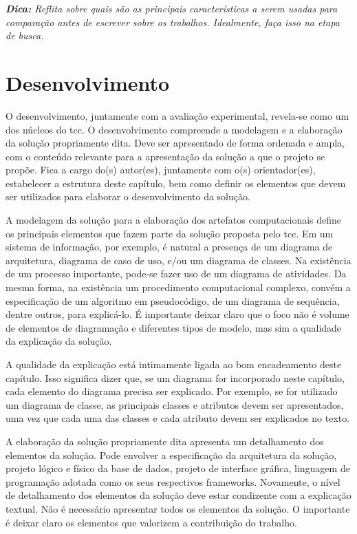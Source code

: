 \documentclass{eic-bcc-tcc}
\begin{document}
\textit{\textbf{Dica:} Reflita sobre quais são as principais características a serem usadas para comparação antes de escrever sobre os trabalhos. Idealmente, faça isso na etapa de busca.}


\chapter{Desenvolvimento}
\label{cha:desenvolvimento}

O desenvolvimento, juntamente com a avaliação experimental, revela-se como um dos núcleos do \gls{tcc}. O desenvolvimento compreende a modelagem e a elaboração da solução propriamente dita. Deve ser apresentado de forma ordenada e ampla, com o conteúdo relevante para a apresentação da solução a que o projeto se propõe. Fica a cargo do(s) autor(es), juntamente com o(s) orientador(es), estabelecer a estrutura deste capítulo, bem como definir os elementos que devem ser utilizados para elaborar o desenvolvimento da solução.

A modelagem da solução para a elaboração dos artefatos computacionais define os principais elementos que fazem parte da solução proposta pelo \gls{tcc}. Em um sistema de informação, por exemplo, é natural a presença de um diagrama de arquitetura, diagrama de caso de uso, e/ou um diagrama de classes. Na existência de um processo importante, pode-se fazer uso de um diagrama de atividades. Da mesma forma, na existência um procedimento computacional complexo, convém a especificação de um algoritmo em pseudocódigo, de um diagrama de sequência, dentre outros, para explicá-lo. É importante deixar claro que o foco não é volume de elementos de diagramação e diferentes tipos de modelo, mas sim a qualidade da explicação da solução.

A qualidade da explicação está intimamente ligada ao bom encadeamento deste capítulo. Isso significa dizer que, se um diagrama for incorporado neste capítulo, cada elemento do diagrama precisa ser explicado. Por exemplo, se for utilizado um diagrama de classe, as principais classes e atributos devem ser apresentados, uma vez que cada uma das classes e cada atributo devem ser explicados no texto.

A elaboração da solução propriamente dita apresenta um detalhamento dos elementos da solução. Pode envolver a especificação da arquitetura da solução, projeto lógico e físico da base de dados, projeto de interface gráfica, linguagem de programação adotada como os seus respectivos frameworks. Novamente, o nível de detalhamento dos elementos da solução deve estar condizente com a explicação textual. Não é necessário apresentar todos os elementos da solução. O importante é deixar claro os elementos que valorizem a contribuição do trabalho.
\end{document}

